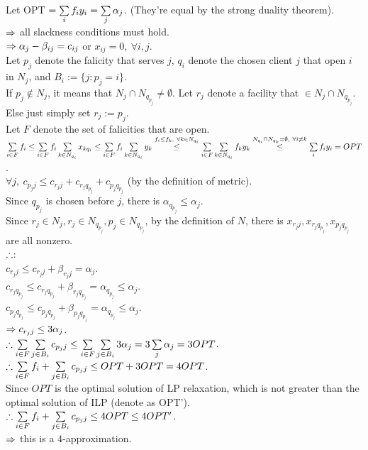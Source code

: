 \begin{pr}
Let OPT $=\sum\limits_if_iy_i=\sum\limits_j\alpha_j$. (They're equal by the strong duality theorem).\\
$\Rightarrow$ all slackness conditions must hold.\\
$\Rightarrow\alpha_j-\beta_{ij}=c_{ij}$ or $x_{ij}=0,\ \forall i, j$.\\
Let $p_j$ denote the falicity that serves $j$, $q_i$ denote the chosen client $j$ that open $i$ in $N_j$, and $B_i:=\{j:p_j=i\}$.\\
If $p_j\notin N_j$, it means that $N_j\cap N_{q_{p_j}}\neq\emptyset$. Let $r_j$ denote a facility that $\in N_j\cap N_{q_{p_j}}$.\\
Else just simply set $r_j:=p_j$.\\
Let $F$ denote the set of falicities that are open.\\
$\suml_{i\in F}f_i\leq\suml_{i\in F}f_i\suml_{k\in N_{q_i}}x_{kq_i}\leq\suml_{i\in F}f_i\suml_{k\in N_{q_i}}y_k\overset{f_i\leq f_k,\ \forall k\in N_{q_i}}\leq\suml_{i\in F}\suml_{k\in N_{q_i}}f_ky_k\overset{N_{q_i}\cap N_{q_k}=\emptyset,\ \forall i\neq k}\leq\suml_if_iy_i=OPT$.\\
$\forall j,\ c_{p_jj}\leq c_{r_jj}+c_{r_jq_{p_j}}+c_{p_jq_{p_j}}$ (by the definition of metric).\\
Since $q_{p_j}$ is chosen before $j$, there is $\alpha_{q_{p_j}}\leq\alpha_j$.\\
Since $r_j\in N_j, r_j\in N_{q_{p_j}}, p_j\in N_{q_{p_j}}$, by the definition of $N$, there is $x_{r_jj}, x_{r_jq_{p_j}}, x_{p_jq_{p_j}}$ are all nonzero.\\
$\therefore$:\\
$c_{r_jj}\leq c_{r_jj}+\beta_{r_jj}=\alpha_j$.\\
$c_{r_jq_{p_j}}\leq c_{r_jq_{p_j}}+\beta_{r_jq_{p_j}}=\alpha_{q_{p_j}}\leq\alpha_j$.\\
$c_{p_jq_{p_j}}\leq c_{p_jq_{p_j}}+\beta_{p_jq_{p_j}}=\alpha_{q_{p_j}}\leq\alpha_j$.\\
$\Rightarrow c_{r_jj}\leq3\alpha_j$.\\
$\therefore\sum\limits_{i\in F}\sum\limits_{j\in B_i}c_{p_jj}\leq\sum\limits_{i\in F}\sum\limits_{j\in B_i}3\alpha_j=3\sum\limits_j\alpha_j=3OPT$.\\
$\therefore\sum\limits_{i\in F}f_i+\sum\limits_{j\in B_i}c_{p_jj}\leq OPT+3OPT=4OPT$.\\
Since $OPT$ is the optimal solution of LP relaxation, which is not greater than the optimal solution of ILP (denote as OPT').\\
$\therefore\sum\limits_{i\in F}f_i+\sum\limits_{j\in B_i}c_{p_jj}\leq4OPT\leq4OPT'$.\\
$\Rightarrow$ this is a $4$-approximation.
\end{pr}
